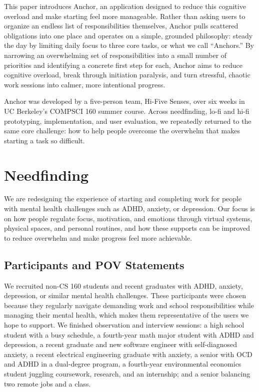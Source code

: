 \documentclass[sigplan,screen]{acmart}
\begin{document}
This paper introduces Anchor, an application designed to reduce this cognitive overload and make starting feel more manageable. Rather than asking users to organize an endless list of responsibilities themselves, Anchor pulls scattered obligations into one place and operates on a simple, grounded philosophy: steady the day by limiting daily focus to three core tasks, or what we call “Anchors.” By narrowing an overwhelming set of responsibilities into a small number of priorities and identifying a concrete first step for each, Anchor aims to reduce cognitive overload, break through initiation paralysis, and turn stressful, chaotic work sessions into calmer, more intentional progress.

Anchor was developed by a five-person team, Hi-Five Senses, over six weeks in UC Berkeley’s COMPSCI 160 summer course. Across needfinding, lo-fi and hi-fi prototyping, implementation, and user evaluation, we repeatedly returned to the same core challenge: how to help people overcome the overwhelm that makes starting a task so difficult.

\section{Needfinding}
We are redesigning the experience of starting and completing work for people with mental health challenges such as ADHD, anxiety, or depression. Our focus is on how people regulate focus, motivation, and emotions through virtual systems, physical spaces, and personal routines, and how these supports can be improved to reduce overwhelm and make progress feel more achievable.

\subsection{Participants and POV Statements}
We recruited non-CS 160 students and recent graduates with ADHD, anxiety, depression, or similar mental health challenges. These participants were chosen because they regularly navigate demanding work and school responsibilities while managing their mental health, which makes them representative of the users we hope to support. We finished observation and interview sessions: a high school student with a busy schedule, a fourth-year math major student with ADHD and depression, a recent graduate and new software engineer with self-diagnosed anxiety, a recent electrical engineering graduate with anxiety, a senior with OCD and ADHD in a dual-degree program, a fourth-year environmental economics student juggling coursework, research, and an internship; and a senior balancing two remote jobs and a class.
\end{document}
